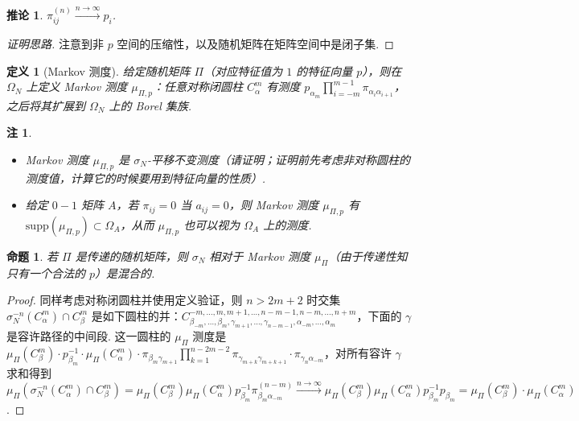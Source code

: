 \documentclass[11pt, a4paper, oneside]{ctexart}
\newtheorem{corollary}[theorem]{推论}
\newtheorem{definition}[theorem]{定义}
\newtheorem{proposition}[theorem]{命题}
\newtheorem{remark}[theorem]{注}
\newcommand{\supp}{\mathrm{supp}}
\begin{document}
    \begin{corollary}
        $\pi_{ij}^{(n)}\stackrel{n\to\infty}{\to}p_i$.
    \end{corollary}
    \begin{proof}[证明思路]
        注意到非 $p$ 空间的压缩性，以及随机矩阵在矩阵空间中是闭子集.
    \end{proof}

    \begin{definition}[Markov 测度]
        给定随机矩阵 $\Pi$（对应特征值为 $1$ 的特征向量 $p$），则在 $\Omega_N$ 上定义 Markov 测度 $\mu_{\Pi,p}$：任意对称闭圆柱 $C_{\alpha}^{m}$ 有测度 $p_{\alpha_m}\prod\limits_{i=-m}^{m-1}\pi_{\alpha_i\alpha_{i+1}}$，之后将其扩展到 $\Omega_N$ 上的 Borel 集族.
    \end{definition}
    \begin{remark}
        \begin{itemize}
            \item Markov 测度 $\mu_{\Pi,p}$ 是 $\sigma_N$-平移不变测度（请证明；证明前先考虑非对称圆柱的测度值，计算它的时候要用到特征向量的性质）.
            \item 给定 $0-1$ 矩阵 $A$，若 $\pi_{ij}=0$ 当 $a_{ij}=0$，则 Markov 测度 $\mu_{\Pi,p}$ 有 $\supp(\mu_{\Pi,p})\subset \Omega_A$，从而 $\mu_{\Pi,p}$ 也可以视为 $\Omega_A$ 上的测度.
        \end{itemize}
    \end{remark}

    \begin{proposition}
        若 $\Pi$ 是传递的随机矩阵，则 $\sigma_N$ 相对于 Markov 测度 $\mu_{\Pi}$（由于传递性知只有一个合法的 $p$）是混合的.
    \end{proposition}
    \begin{proof}
        同样考虑对称闭圆柱并使用定义验证，则 $n>2m+2$ 时交集 $\sigma_N^{-n}(C_{\alpha}^{m})\cap C_{\beta}^{m}$ 是如下圆柱的并：$C_{\beta_{-m},\ldots,\beta_m,\gamma_{m+1},\ldots,\gamma_{n-m-1},\alpha_{-m},\ldots,\alpha_m}^{-m,\ldots,m,m+1,\ldots,n-m-1,n-m,\ldots,n+m}$，下面的 $\gamma$ 是容许路径的中间段. 这一圆柱的 $\mu_{\Pi}$ 测度是 $\mu_{\Pi}(C_{\beta}^{m})\cdot p_{\beta_m}^{-1}\cdot \mu_{\Pi}(C_{\alpha}^{m})\cdot \pi_{\beta_m\gamma_{m+1}}\prod\limits_{k=1}^{n-2m-2}\pi_{\gamma_{m+k}\gamma_{m+k+1}}\cdot \pi_{\gamma_n\alpha_{-m}}$，对所有容许 $\gamma$ 求和得到 $\mu_{\Pi}(\sigma_N^{-n}(C_{\alpha}^{m})\cap C_{\beta}^{m})=\mu_{\Pi}(C_{\beta}^{m})\mu_{\Pi}(C_{\alpha}^{m})p_{\beta_m}^{-1}\pi_{\beta_m\alpha_{-m}}^{(n-m)}\stackrel{n\to\infty}{\to}\mu_{\Pi}(C_{\beta}^{m})\mu_{\Pi}(C_{\alpha}^{m})p_{\beta_m}^{-1}p_{\beta_m}=\mu_{\Pi}(C_{\beta}^{m})\cdot \mu_{\Pi}(C_{\alpha}^{m})$.
    \end{proof}
\end{document}
